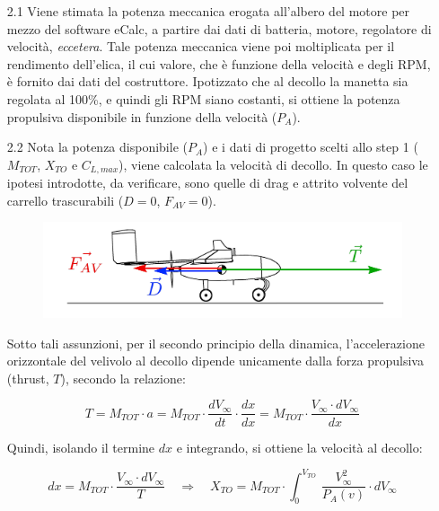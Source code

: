 \documentclass[12pt]{article}
\begin{document}
\begin{itemize}
\item[2.1] Viene stimata la potenza meccanica erogata all'albero del motore per mezzo del software eCalc, a partire dai dati di batteria, motore, regolatore di velocità, \textit{eccetera}. Tale potenza meccanica viene poi moltiplicata per il rendimento dell'elica, il cui valore, che è funzione della velocità e degli RPM, è fornito dai dati del costruttore. Ipotizzato che al decollo la manetta sia regolata al 100\%, e quindi gli RPM siano costanti, si ottiene la potenza propulsiva disponibile in funzione della velocità ($P_A$).

\item[2.2] Nota la potenza disponibile ($P_A$) e i dati di progetto scelti allo step 1 ($M_{TOT}$, $X_{TO}$ e $C_{L, max}$), viene calcolata la velocità di decollo. In questo caso le ipotesi introdotte, da verificare, sono quelle di drag e attrito volvente del carrello trascurabili ($D = 0$, $F_{AV} = 0$). 

\begin{figure}[h]
	\centering
	\includegraphics[width=13cm]{img/forze}
\end{figure}

Sotto tali assunzioni, per il secondo principio della dinamica, l'accelerazione orizzontale del velivolo al decollo dipende unicamente dalla forza propulsiva (thrust, $T$), secondo la relazione:

\begin{equation}
T = M_{TOT} \cdot a = M_{TOT} \cdot \frac{dV_\infty}{dt} \cdot \frac{dx}{dx} = M_{TOT} \cdot \frac{V_\infty \cdot dV_\infty}{dx}
\end{equation}

\noindent
Quindi, isolando il termine $dx$ e integrando, si ottiene la velocità al decollo:

\begin{equation}
dx = M_{TOT} \cdot \frac{V_\infty \cdot dV_\infty}{T} \quad \Rightarrow \quad X_{TO} = M_{TOT} \cdot \int_0^{V_{TO}} \, \frac{V_\infty^2}{P_A(v)} \cdot dV_\infty
\end{equation}
\end{itemize}
\end{document}
